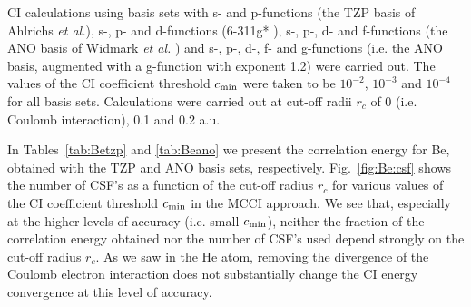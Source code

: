 CI calculations using basis sets with s- and p-functions 
(the TZP basis of Ahlrichs {\it et al.}\cite{tmole_basis}), 
s-, p- and d-functions (6-311g* \cite{6311g}), 
s-, p-, d- and f-functions
(the ANO basis of Widmark {\it et al.} \cite{be_ano}) 
and s-, p-, d-, f- and g-functions 
(i.e. the ANO basis, augmented with a g-function with exponent 1.2) 
were carried out. 
The values of the CI coefficient threshold $c_{\rm min}$ were taken 
to be $10^{-2}$, $10^{-3}$ and $10^{-4}$ for all basis sets. 
Calculations were carried out at cut-off radii 
$r_c$ of 0 (i.e. Coulomb interaction), 0.1 and 0.2 a.u.

In Tables~\ref{tab:Betzp} and \ref{tab:Beano} we present the 
correlation energy for Be, obtained with the TZP and ANO basis 
sets, respectively.
Fig.~\ref{fig:Be:csf} shows the 
number of CSF's as a function of the cut-off radius $r_c$ 
for various values of the CI coefficient threshold $c_{\rm min}$ 
in the MCCI approach.
We see that, especially at the higher levels of accuracy 
(i.e. small $c_{\rm min}$), neither the fraction of the correlation 
energy obtained nor the number of CSF's used depend strongly on 
the cut-off radius $r_c$.
As we saw in the He atom, removing the divergence of the
Coulomb electron interaction does not substantially change
the CI energy convergence at this level of accuracy.

%
%

